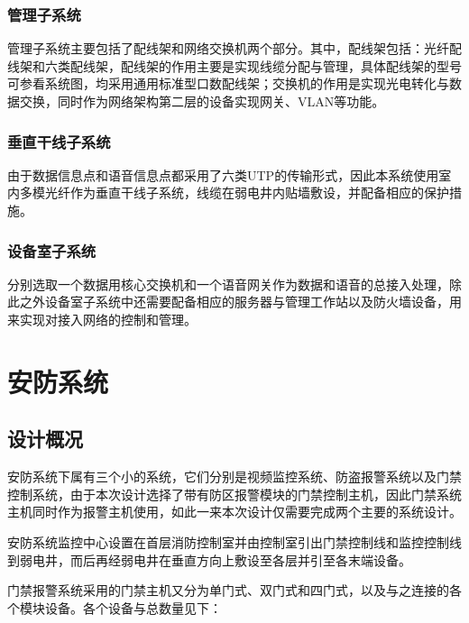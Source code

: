 \documentclass{gdutart}
\begin{document}
      \subsubsection{管理子系统}
      管理子系统主要包括了配线架和网络交换机两个部分。其中，配线架包括：光纤配线架和六类配线架，配线架的作用主要是实现线缆分配与管理，具体配线架的型号可参看系统图，均采用通用标准型口数配线架；交换机的作用是实现光电转化与数据交换，同时作为网络架构第二层的设备实现网关、VLAN等功能。

      \subsubsection{垂直干线子系统}
      由于数据信息点和语音信息点都采用了六类UTP的传输形式，因此本系统使用室内多模光纤作为垂直干线子系统，线缆在弱电井内贴墙敷设，并配备相应的保护措施。

      \subsubsection{设备室子系统}
      分别选取一个数据用核心交换机和一个语音网关作为数据和语音的总接入处理，除此之外设备室子系统中还需要配备相应的服务器与管理工作站以及防火墙设备，用来实现对接入网络的控制和管理。\clearpage

  \section{安防系统}
    \subsection{设计概况}
    安防系统下属有三个小的系统，它们分别是视频监控系统、防盗报警系统以及门禁控制系统，由于本次设计选择了带有防区报警模块的门禁控制主机，因此门禁系统主机同时作为报警主机使用，如此一来本次设计仅需要完成两个主要的系统设计。

    安防系统监控中心设置在首层消防控制室并由控制室引出门禁控制线和监控控制线到弱电井，而后再经弱电井在垂直方向上敷设至各层并引至各末端设备。

    门禁报警系统采用的门禁主机又分为单门式、双门式和四门式，以及与之连接的各个模块设备。各个设备与总数量见下：
\end{document}
